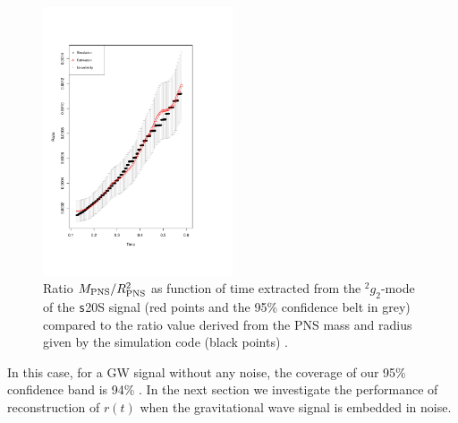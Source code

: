 \begin{figure}
 \centering
 \includegraphics[width=0.5\textwidth,height=0.3\textheight]{plots/ratio}
 \caption{Ratio $M_{\rm PNS}/R_{\rm PNS}^2$ as function of time extracted from the $\mbox{}^2 g_2$-mode of the {\texttt s20S} signal (red points and the 95\% confidence belt in grey) compared to the ratio value derived from the PNS mass and radius given by the simulation code (black points) .} \label{fig:ratio}
\end{figure}


In this case, for a GW signal without any noise, the coverage of our 95\% confidence band is 94\% .
In the next section we investigate the performance of  reconstruction of $r(t)$ when the gravitational wave
signal is embedded in noise.
